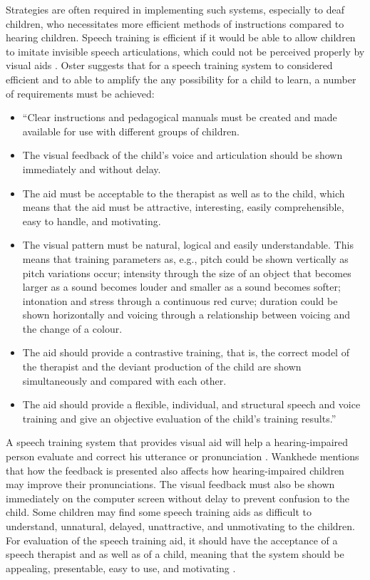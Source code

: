 Strategies are often required in implementing such systems, especially to deaf children, who necessitates more efficient methods of instructions compared to hearing children. Speech training is efficient if it would be able to allow children to imitate invisible speech articulations, which could not be perceived properly by visual aids \cite{oster:1996:cac}. Oster \citeyear{oster:1996:cac} suggests that for a speech training system to considered efficient and to able to amplify the any possibility for a child to learn, a number of requirements must be achieved:

\begin{itemize}
\item “Clear instructions and pedagogical manuals must be created and made available for use with different groups of children.
\item The visual feedback of the child’s voice and articulation should be shown immediately and without delay.
\item The aid must be acceptable to the therapist as well as to the child, which means that the aid must be attractive, interesting, easily comprehensible, easy to handle, and motivating.
\item The visual pattern must be natural, logical and easily understandable. This means that training parameters as, e.g., pitch could be shown vertically as pitch variations occur; intensity through the size of an object that becomes larger as a sound becomes louder and smaller as a sound becomes softer; intonation and stress through a continuous red curve; duration could be shown horizontally and voicing through a relationship between voicing and the change of a colour.
\item The aid should provide a contrastive training, that is, the correct model of the therapist and the deviant production of the child are shown simultaneously and compared with each other.
\item The aid should provide a flexible, individual, and structural speech and voice training and give an objective evaluation of the child’s training results.” \cite{oster:1996:cac}
\end{itemize}

A speech training system that provides visual aid will help a hearing-impaired person evaluate and correct his utterance or pronunciation \cite{wankhede:2014:dvs}. Wankhede mentions that how the feedback is presented also affects how hearing-impaired children may improve their pronunciations. The visual feedback must also be shown immediately on the computer screen without delay to prevent confusion to the child. Some children may find some speech training aids as difficult to understand, unnatural, delayed, unattractive, and unmotivating to the children. For evaluation of the speech training aid, it should have the acceptance of a speech therapist and as well as of a child, meaning that the system should be appealing, presentable, easy to use, and motivating \cite{wankhede:2014:dvs}.

